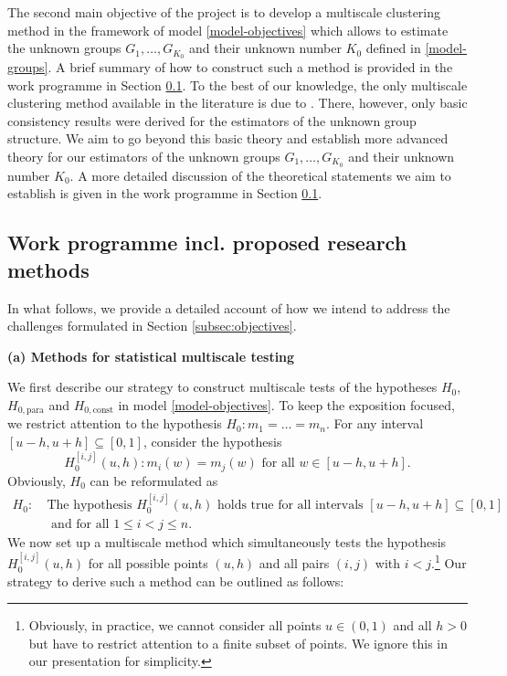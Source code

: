 \documentclass[a4paper,12pt]{article}
\begin{document}
\noindent The second main objective of the project is to develop a multiscale clustering method in the framework of model \eqref{model-objectives} which allows to estimate the unknown groups $G_1,\ldots,G_{K_0}$ and their unknown number $K_0$ defined in \eqref{model-groups}. 
A brief summary of how to construct such a method is provided in the work programme in Section \ref{subsec:WP}. To the best of our knowledge, the only multiscale clustering method available in the literature is due to \cite{VogtLinton2018}. There, however, only basic consistency results were derived for the estimators of the unknown group structure. We aim to go beyond this basic theory and establish more advanced theory for our estimators of the unknown groups $G_1,\ldots,G_{K_0}$ and their unknown number $K_0$. A more detailed discussion of the theoretical statements we aim to establish is given in the work programme in Section \ref{subsec:WP}. 
\vspace{10pt}


\subsection{Work programme incl. proposed research methods}\label{subsec:WP}


In what follows, we provide a detailed account of how we intend to address the challenges formulated in Section \ref{subsec:objectives}. 
\vspace{10pt}


\noindent \textbf{(a) Methods for statistical multiscale testing} 
\vspace{10pt} 


\noindent We first describe our strategy to construct multiscale tests of the hypotheses $H_0$, $H_{0,\text{para}}$ and $H_{0,\text{const}}$ in model \eqref{model-objectives}. To keep the exposition focused, we restrict attention to the hypothesis $H_0: m_1 = \ldots = m_n$. For any interval $[u-h,u+h] \subseteq [0,1]$, consider the hypothesis
\[ H_0^{[i,j]}(u,h): m_i(w) = m_j(w) \text{ for all } w \in [u-h,u+h]. \] 
Obviously, $H_0$ can be reformulated as
\begin{align*}
H_0: \ & \text{The hypothesis } H_0^{[i,j]}(u,h) \text{ holds true for all intervals } [u-h,u+h] \subseteq [0,1] \\ & \text{ and for all } 1 \le i < j \le n. 
\end{align*} 
We now set up a multiscale method which simultaneously tests the hypothesis \linebreak $H_0^{[i,j]}(u,h)$ for all possible points $(u,h)$ and all pairs $(i,j)$ with $i < j$.\footnote{Obviously, in practice, we cannot consider all points $u \in (0,1)$ and all $h > 0$ but have to restrict attention to a finite subset of points. We ignore this in our presentation for simplicity.} Our stra\-tegy to derive such a method can be outlined as follows:
\vspace{10pt}
\end{document}
